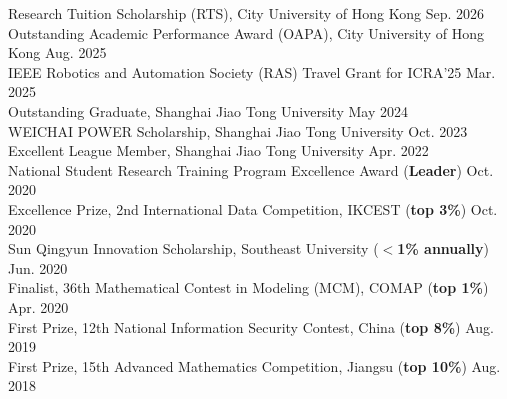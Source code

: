 \documentclass[letterpaper,11pt]{article}
\begin{document}
{{{{{{\begin{flushleft}
    \normalsize
    {Research Tuition Scholarship (RTS), City University of Hong Kong \cftdotfill{\cftdotsep}Sep. 2026}\\
    \vspace{1mm}
    {Outstanding Academic Performance Award (OAPA), City University of Hong Kong \cftdotfill{\cftdotsep}Aug. 2025}\\
    \vspace{1mm}
    {IEEE Robotics and Automation Society (RAS) Travel Grant for ICRA'25 \cftdotfill{\cftdotsep}Mar. 2025}\\
    \vspace{1mm}
    {Outstanding Graduate, Shanghai Jiao Tong University \cftdotfill{\cftdotsep}May 2024}\\
    \vspace{1mm}
    {WEICHAI POWER Scholarship, Shanghai Jiao Tong University \cftdotfill{\cftdotsep}Oct. 2023}\\
    \vspace{1mm}
    {Excellent League Member, Shanghai Jiao Tong University \cftdotfill{\cftdotsep}Apr. 2022}\\
    \vspace{1mm}
    {National Student Research Training Program Excellence Award (\textbf{Leader}) \cftdotfill{\cftdotsep}Oct. 2020}\\
    \vspace{1mm}
    {Excellence Prize, 2nd International Data Competition, IKCEST (\textbf{top 3\%}) \cftdotfill{\cftdotsep}Oct. 2020}\\
    \vspace{1mm}
    {Sun Qingyun Innovation Scholarship, Southeast University (\textbf{$<$1\% annually}) \cftdotfill{\cftdotsep}Jun. 2020}\\
    \vspace{1mm}
    {Finalist, 36th Mathematical Contest in Modeling (MCM), COMAP (\textbf{top 1\%}) \cftdotfill{\cftdotsep}Apr. 2020}\\
    \vspace{1mm}
    {First Prize, 12th National Information Security Contest, China (\textbf{top 8\%}) \cftdotfill{\cftdotsep}Aug. 2019}\\
    \vspace{1mm}
    {First Prize, 15th Advanced Mathematics Competition, Jiangsu (\textbf{top 10\%}) \cftdotfill{\cftdotsep}Aug. 2018}
\end{flushleft}



}}}}}}
\end{document}
